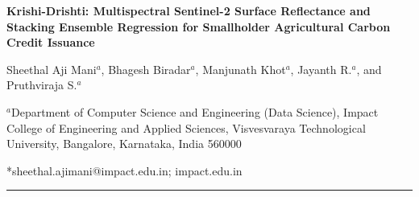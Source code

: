 \documentclass[a4paper,10pt]{article}
\begin{document}
\begin{center}
  {\fontsize{16}{19}\bfseries\selectfont
   Krishi-Drishti: Multispectral Sentinel-2 Surface Reflectance and Stacking Ensemble
   Regression for Smallholder Agricultural Carbon Credit Issuance\par}

  \vspace{10pt}

  {\fontsize{12}{14}\selectfont
   Sheethal Aji Mani$^{a}$, Bhagesh Biradar$^{a}$,
   Manjunath Khot$^{a}$,
   Jayanth R.$^{a}$, and Pruthviraja S.$^{a}$\par}

  \vspace{6pt}

  {\fontsize{10}{12}\selectfont
   $^{a}$Department of Computer Science and Engineering (Data Science),
   Impact College of Engineering and Applied Sciences,
   Visvesvaraya Technological University,
   Bangalore, Karnataka, India 560000\par}

  \vspace{4pt}
  {\fontsize{9}{11}\selectfont
   *sheethal.ajimani@impact.edu.in; impact.edu.in\par}
\end{center}

\vspace{8pt}
\hrule
\vspace{8pt}

\end{document}
